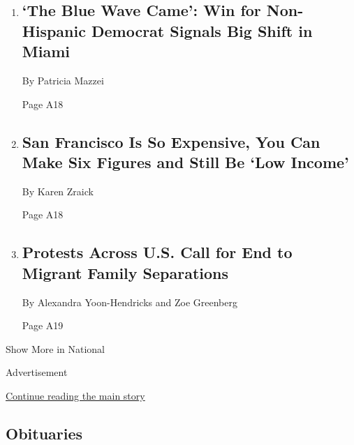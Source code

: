 \begin{enumerate}
\def\labelenumi{\arabic{enumi}.}
\item
  \href{/2018/06/30/us/miami-little-havana-cuban.html}{}

  \hypertarget{the-blue-wave-came-win-for-non-hispanic-democrat-signals-big-shift-in-miami-1}{%
  \subsection{`The Blue Wave Came': Win for Non-Hispanic Democrat
  Signals Big Shift in
  Miami}\label{the-blue-wave-came-win-for-non-hispanic-democrat-signals-big-shift-in-miami-1}}

  By Patricia Mazzei

  Page A18
\item
  \href{/2018/06/30/us/bay-area-housing-market.html}{}

  \hypertarget{san-francisco-is-so-expensive-you-can-make-six-figures-and-still-be-low-income}{%
  \subsection{San Francisco Is So Expensive, You Can Make Six Figures
  and Still Be `Low
  Income'}\label{san-francisco-is-so-expensive-you-can-make-six-figures-and-still-be-low-income}}

  By Karen Zraick

  Page A18
\item
  \href{/2018/06/30/us/politics/trump-protests-family-separation.html}{}

  \hypertarget{protests-across-us-call-for-end-to-migrant-family-separations-1}{%
  \subsection{Protests Across U.S. Call for End to Migrant Family
  Separations}\label{protests-across-us-call-for-end-to-migrant-family-separations-1}}

  By Alexandra Yoon-Hendricks and Zoe Greenberg

  Page A19
\end{enumerate}

Show More in National

Advertisement

\protect\hyperlink{after-mid2}{Continue reading the main story}

\hypertarget{obituaries}{%
\subsection{Obituaries}\label{obituaries}}

